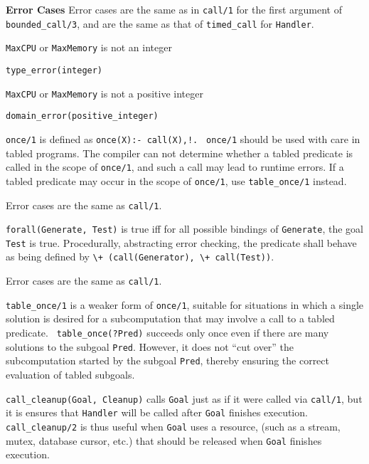 \begin{description}
{\bf Error Cases} 
%
Error cases are the same as in {\tt call/1} for the first argument of
{\tt bounded\_call/3}, and are the same as that of {\tt timed\_call}
for {\tt Handler}.  
%
\begin{description}
\item {\tt MaxCPU} or {\tt MaxMemory} is not an integer
\bi
\item {\tt type\_error(integer)}
\ei
\item {\tt MaxCPU} or {\tt MaxMemory}  is not a positive integer
\bi
\item {\tt domain\_error(positive\_integer)}
\ei
\end{description}

%
    {\tt once/1} is defined as {\tt once(X):- call(X),!.}  {\tt
    once/1} should be used with care in tabled programs.  The compiler
    can not determine whether a tabled predicate is called in the
    scope of {\tt once/1}, and such a call may lead to runtime errors.
    If a tabled predicate may occur in the scope of {\tt once/1}, use
    {\tt table\_once/1} instead.

    Error cases are the same as {\tt call/1}.

%
{\tt forall(Generate, Test)} is true iff for all possible bindings of
{\tt Generate}, the goal {\tt Test} is true. Procedurally, abstracting
error checking, the predicate shall behave as being defined by 
\verb|\+ (call(Generator), \+ call(Test))|.

    Error cases are the same as {\tt call/1}.

    {\tt table\_once/1} is a weaker form of {\tt once/1}, suitable for
    situations in which a single solution is desired for a
    subcomputation that may involve a call to a tabled predicate.  {\tt
    table\_once(?Pred)} succeeds only once even if there are many
    solutions to the subgoal {\tt Pred}.  However, it does not ``cut
    over'' the subcomputation started by the subgoal {\tt Pred},
    thereby ensuring the correct evaluation of tabled subgoals.

%
{\tt call\_cleanup(Goal, Cleanup)} calls {\tt Goal} just as if it were
called via {\tt call/1}, but it is ensures that {\tt Handler} will be
called after {\tt Goal} finishes execution.  {\tt call\_cleanup/2} is
thus useful when {\tt Goal} uses a resource, (such as a stream, mutex,
database cursor, etc.) that should be released when {\tt Goal}
finishes execution.


\end{description}
